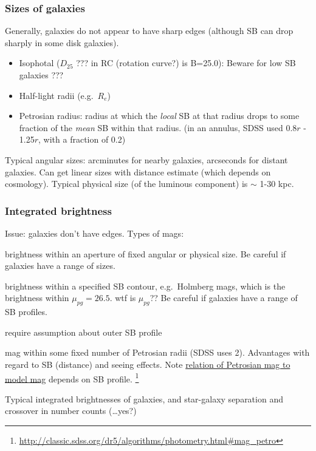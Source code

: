 \documentclass{article}
\newcommand{\mynotes}[1]{\textcolor{cadmiumgreen}{#1}}
\begin{document}
\subsubsection{Sizes of galaxies}
Generally, galaxies do not appear to have sharp edges (although SB can
drop sharply in some disk galaxies).
\begin{itemize}
    \item Isophotal ($D_{25}$ \mynotes{???} in RC \mynotes{(rotation curve?)}
        is B=25.0): Beware for low SB galaxies \mynotes{???}
    \item Half-light radii (e.g.\ $R_{e}$)
    \item Petrosian radius: radius at which the \emph{local}
        SB at that radius drops to some fraction of the \emph{mean} SB within
        that radius.  (in an annulus, SDSS used 0.8$r$ - 1.25$r$, with a
        fraction of 0.2)
\end{itemize}
Typical angular sizes: arcminutes for nearby galaxies, arcseconds for
distant galaxies. Can get linear sizes with distance estimate
(which depends on cosmology). Typical physical size (of the luminous
component) is $\sim$ 1-30 kpc.

\subsubsection{Integrated brightness}\label{intb}
Issue: galaxies don't have edges. Types of mags:
\begin{description}[align=right, labelwidth=0.5in,
        labelindent=0.25in,
        leftmargin=1in]
    \item [Metric:] brightness within an aperture of fixed
        angular or physical size. Be careful if galaxies have a range
        of sizes.
    \item [Isophotal:] brightness within a specified SB
        contour, e.g.\ Holmberg mags, which is the brightness within
        $\mu_{pg} = 26.5$. \mynotes{wtf is $\mu_{pg}$??}
        Be careful if galaxies have a range of SB profiles.
    \item [Model:] require assumption about outer SB profile
    \item [Petrosian:]
        mag within some fixed number of Petrosian
        radii (SDSS uses 2).
        Advantages with regard to SB (distance) and seeing effects. Note
        \href{http://astronomy.nmsu.edu/holtz/a555/images/petrogal.htm}
        {relation of Petrosian mag to model mag} depends on SB profile.
        \footnote{\url{http://classic.sdss.org/dr5/algorithms/photometry.html\#mag_petro}}
\end{description}
Typical integrated brightnesses of galaxies, and star-galaxy separation
and crossover in number counts \mynotes{(\ldots yes?)}
\end{document}

